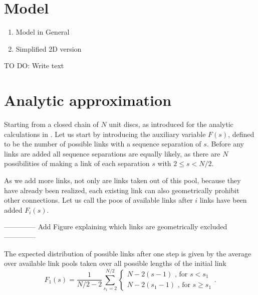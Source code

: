 \documentclass[reprint,amsmath,amssymb,rmp,onecolumn,notitlepage,11pt]{revtex4-1}
\begin{document}
\section*{Model}
\begin{enumerate}
    \item Model in General
    \item Simplified 2D version
\end{enumerate}
TO DO: Write text
\section*{Analytic approximation}
Starting from a closed chain of $N$ unit discs, as introduced for the analytic calculations in \cite{molkenthin2016scaling}.
Let us start by introducing the auxiliary variable $F(s)$, defined to be the number of possible links with a sequence separation of $s$. Before any links are added all sequence separations are equally likely, as there are $N$ possibilities of making a link of each separation $s$ with $2\leq s < N/2$.

As we add more links, not only are links taken out of this pool, because they have already been realized, each existing link can also geometrically prohibit other connections.
Let us call the poos of available links after $i$ links have been added $F_i(s)$.

-------------- Add Figure explaining which links are geometrically excluded --------------

The expected distribution of possible links after one step is given by the average over available link pools taken over all possible lengths of the initial link
\begin{equation}
    F_1(s)= \frac{1}{N/2-2} \sum_{s_1=2}^{N/2} { \begin{cases}
    N-2(s-1) \text{ , for } s<s_1\\
    N-2(s_1 -1)\text{ , for } s\geq s_1
    \end{cases}}.
\end{equation}
\end{document}

